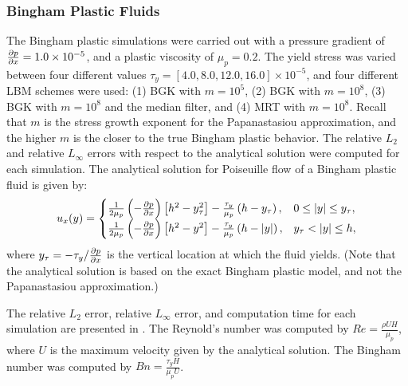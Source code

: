 \subsubsection{Bingham Plastic Fluids} \label{sec:poise-bing}

The Bingham plastic simulations were carried out with a pressure gradient of $\frac{\partial p}{\partial x} = 1.0 \times 10^{-5}$, and a plastic viscosity of $\mu_p = 0.2$.
The yield stress was varied between four different values $\tau_y = [4.0, 8.0, 12.0, 16.0] \times 10^{-5}$, and four different LBM schemes were used: (1) BGK with $m = 10^5$, (2) BGK with $m = 10^8$, (3) BGK with $m = 10^8$ and the median filter, and (4) MRT with $m = 10^8$. 
Recall that $m$ is the stress growth exponent for the Papanastasiou approximation, and the higher $m$ is the closer to the true Bingham plastic behavior.
The relative $L_2$ and relative $L_{\infty}$ errors with respect to the analytical solution were computed for each simulation.
The analytical solution for Poiseuille flow of a Bingham plastic fluid is given by:
\begin{equation} \label{eq:analytical-bingham}
u_x(y) = \begin{cases}
\frac{1}{2 \mu_p} \left(-\frac{\partial p}{\partial x}\right) \left[h^2 - y_{\tau}^2 \right] - \frac{\tau_y}{\mu_p} \left(h - y_{\tau}\right), & 0 \leq |y| \leq y_{\tau}, \\
\frac{1}{2 \mu_p} \left(-\frac{\partial p}{\partial x}\right) \left[h^2 - y^2 \right] - \frac{\tau_y}{\mu_p} \left(h - |y|\right), & y_{\tau} < |y| \leq h,
\end{cases}
\end{equation}
\noindent where $y_{\tau} = -\tau_y / \frac{\partial p}{\partial x}$ is the vertical location at which the fluid yields.
(Note that the analytical solution is based on the exact Bingham plastic model, and not the Papanastasiou approximation.)

The relative $L_2$ error, relative $L_{\infty}$ error, and computation time for each simulation are presented in .
The Reynold's number was computed by $Re = \frac{\rho U H}{\mu_p}$, where $U$ is the maximum velocity given by the analytical solution.
The Bingham number was computed by $Bn = \frac{\tau_y H}{\mu_p U}$.



